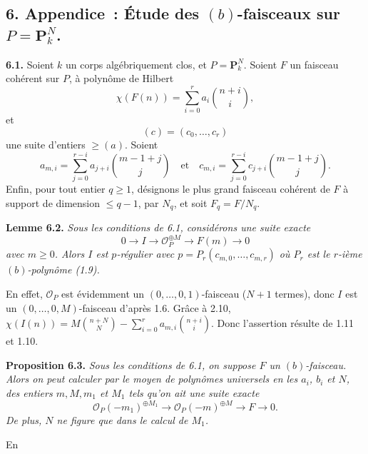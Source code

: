 \subsection*{6. Appendice~: \'Etude des $(b)$-faisceaux sur $P=\mathbf P^N_k$.}

\textbf{6.1.} Soient $k$ un corps alg\'ebriquement clos, et $P=\mathbf P^N_k$. Soient $F$ un faisceau coh\'erent sur $P$, \`a polyn\^ome de Hilbert
\[
   \chi(F(n))=\sum_{i=0}^{r} a_i \binom{n+i}{i},
\]
et
\[
   (c)=(c_0,\ldots,c_r)
\]
une suite d'entiers $\ge (a)$. Soient
\[
   a_{m,i}=\sum_{j=0}^{r-i}a_{j+i}\binom{m-1+j}{j}\quad\text{et}\quad c_{m,i}=\sum_{j=0}^{r-i}c_{j+i}\binom{m-1+j}{j}.
\]
Enfin, pour tout entier $q\ge1$, d\'esignons le plus grand faisceau coh\'erent de $F$ \`a support de dimension $\le q-1$, par $N_q$, et soit $F_q=F/N_q$.

\textbf{Lemme 6.2.} \emph{Sous les conditions de 6.1, consid\'erons une suite exacte}
\[
   0\longrightarrow I\longrightarrow \mathcal O_P^{\oplus M}\longrightarrow F(m)\longrightarrow0
\]
\emph{avec $m\ge0$. Alors $I$ est $p$-r\'egulier avec \(p=P_r(c_{m,0},\ldots,c_{m,r})\) o\`u $P_r$ est le $r$-i\`eme $(b)$-polyn\^ome (1.9).}

En effet, $\mathcal O_P$ est \'evidemment un $(0,\ldots,0,1)$-faisceau ($N+1$ termes), donc $I$ est un $(0,\ldots,0,M)$-faisceau d'apr\`es 1.6. Gr\^ace \`a 2.10, \(\chi(I(n))=M\binom{n+N}{N}-\sum_{i=0}^{r} a_{m,i}\binom{n+i}{i}\). Donc l'assertion r\'esulte de 1.11 et 1.10.

\textbf{Proposition 6.3.} \emph{Sous les conditions de 6.1, on suppose $F$ un $(b)$-faisceau. Alors on peut calculer par le moyen de polyn\^omes universels en les $a_i$, $b_i$ et $N$, des entiers $m, M, m_1$ et $M_1$ tels qu'on ait une suite exacte}
\[
   \mathcal O_P(-m_1)^{\oplus M_1}\longrightarrow
   \mathcal O_P(-m)^{\oplus M}\longrightarrow F\longrightarrow0.
\]
\emph{De plus, $N$ ne figure que dans le calcul de $M_1$.}

En
